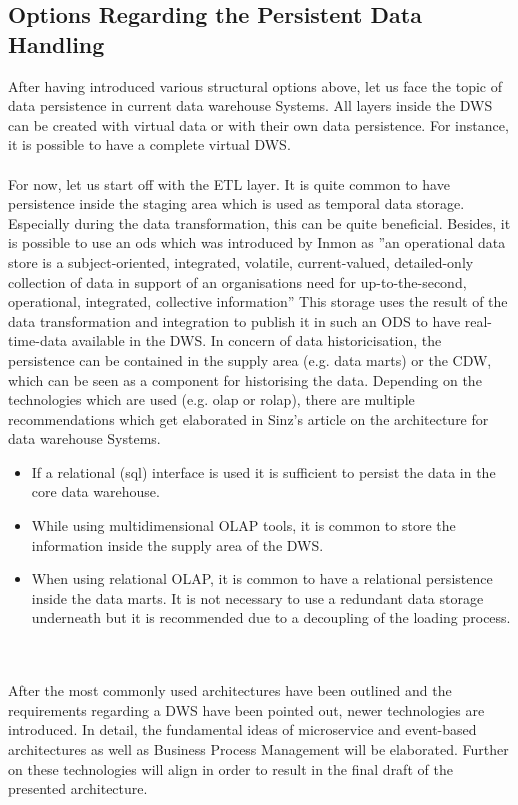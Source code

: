 \subsection{Options Regarding the Persistent Data Handling}
After having introduced various structural options above, let us face the topic of data persistence in current data warehouse Systems.
All layers inside the DWS can be created with virtual data or with their own data persistence. For instance, it is possible to have a complete virtual DWS. \cite{sinz}\newline
\\
\\
For now, let us start off with the ETL layer. It is quite common to have persistence inside the staging area which is used as temporal data storage. Especially during the data transformation, this can be quite beneficial. Besides, it is possible to use an \acrfull{ods} which was introduced by Inmon as ''an operational data store is a subject-oriented, integrated, volatile, current-valued, detailed-only collection of data in support of an organisations need for up-to-the-second, operational, integrated, collective information'' \cite{buildingTheDWS} This storage uses the result of the data transformation and integration to publish it in such an ODS to have real-time-data available in the DWS.\newline
In concern of data historicisation, the persistence can be contained in the supply area (e.g. data marts) or the CDW, which can be seen as a component for historising the data. Depending on the technologies which are used (e.g. \acrshort{olap} or \acrshort{rolap}), there are multiple recommendations which get elaborated in Sinz's article on the architecture for data warehouse Systems.
\begin{itemize}
    \item If a relational (\acrshort{sql}) interface is used it is sufficient to persist the data in the core data warehouse.
    \item While using multidimensional OLAP tools, it is common to store the information inside the supply area of the DWS.
    \item When using relational OLAP, it is common to have a relational persistence inside the data marts. It is not necessary to use a redundant data storage underneath but it is recommended due to a decoupling of the loading process. 
\end{itemize}
\cite{sinz}
\\
\\
After the most commonly used architectures have been outlined and the requirements regarding a DWS have been pointed out, newer technologies are introduced. In detail, the fundamental ideas of microservice and event-based architectures as well as Business Process Management will be elaborated. Further on these technologies will align in order to result in the final draft of the presented architecture.